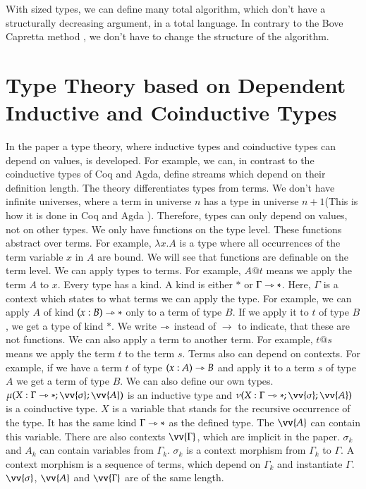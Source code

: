 \documentclass[a4paper,cleardoubleempty,BCOR1cm]{scrbook}
\begin{document}
With sized types, we can define many total algorithm, which don't have a
structurally decreasing argument, in a total language. In contrary to the
Bove Capretta method \cite{bove2005modelling}, we don't have to change the structure of the
algorithm.

\chapter{Type Theory based on Dependent Inductive and Coinductive Types}
\label{sec:org303c431}
In the paper \cite{basold2016type} a type theory, where inductive types and
coinductive types can depend on values, is developed. For example, we can, in
contrast to the coinductive types of Coq and Agda, define streams which depend
on their definition length. The theory differentiates types from terms. We
don't have infinite universes, where a term in universe \(n\) has a type in
universe \(n+1\)(This is how it is done in Coq \cite{sozeau2014universe} and Agda
\cite{agdadocuniverselevels}). Therefore, types can only depend on values, not on
other types. We only have functions on the type level. These functions abstract
over terms. For example, \(\lambda x.A\) is a type where all occurrences of the
term variable \(x\) in \(A\) are bound.  We will see that functions are definable
on the term level. We can apply types to terms. For example, \(A @ t\) means we
apply the term \(A\) to \(x\). Every type has a kind. A kind is either \(*\) or
\(\Gamma\rightarrowtriangle*\). Here, \(\Gamma\) is a context which states to what terms we can
apply the type. For example, we can apply \(A\) of kind \((x:B)\rightarrowtriangle*\) only to a
term of type \(B\). If we apply it to \(t\) of type \(B\), we get a type of kind
\(*\). We write \(\rightarrowtriangle\) instead of \(\rightarrow\) to indicate, that these are not
functions. We can also apply a term to another term. For example, \(t@s\) means
we apply the term \(t\) to the term \(s\).  Terms also can depend on contexts.
For example, if we have a term \(t\) of type \((x:A)\rightarrowtriangle B\) and apply it to a term
\(s\) of type \(A\) we get a term of type \(B\).  We can also define our own types.
\(\mu(X:\Gamma\rat*;\vv{\sigma};\vv{A})\) is an inductive type and
\(\nu(X:\Gamma\rat*;\vv{\sigma};\vv{A})\) is a coinductive type. \(X\) is a
variable that stands for the recursive occurrence of the type. It has the
same kind \(\Gamma\rightarrowtriangle*\) as the defined type. The \(\vv{A}\) can contain this
variable. There are also contexts \(\vv{\Gamma}\), which are implicit in the
paper. \(\sigma_k\) and \(A_k\) can contain variables from \(\Gamma_k\). \(\sigma_k\)
is a context morphism from \(\Gamma_k\) to \(\Gamma\). A context morphism is a
sequence of terms, which depend on \(\Gamma_k\) and instantiate \(\Gamma\).
\(\vv{\sigma}\), \(\vv{A}\) and \(\vv{\Gamma}\) are of the same length.
\end{document}
